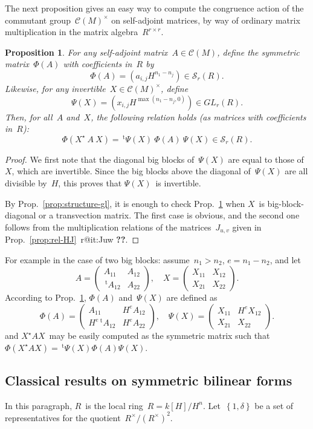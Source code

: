 \documentclass{article}%
\makeatletter
\newtheorem{prop}{Proposition}
\def\labelenumi{(\roman{enumi})}
\def\itemref#1{\expandafter\ifx\csname r@#1\endcsname\relax
  {\bfseries ??}\else{\setcounter{enumi}{\ref{#1}}\labelenumi}\fi}
\let\ro\mathscr
\def\transpose{\,{}^{\mathrm{t}\!}}
\def\acco#1{\left\{#1\right\}}
\def\mat#1{\begin{pmatrix}#1\end{pmatrix}}
\makeatother
\begin{document}
The next proposition gives an easy way to compute the congruence action
of the commutant group~$\ro C(M)^{×}$ on self-adjoint matrices, by way of
ordinary matrix multiplication in the matrix algebra~$R^{r×r}$.

\begin{prop}\label{prop:phantom}
For any self-adjoint matrix~$A ∈ \ro C(M)$, define the symmetric
matrix~$Φ(A)$ with coefficients in~$R$ by
\[ Φ(A) = (a_{i,j} H^{n_1 - n_j}) ∈ \ro S_r(R). \]
Likewise, for any invertible~$X ∈ \ro C(M)^{×}$, define
\[ Ψ(X) = (x_{i,j} H^{\max (n_1-n_j, 0)}) ∈ GL_r(R). \]
Then, for all~$A$ and~$X$, the following relation holds (as matrices with
coefficients in~$R$):
\[ Φ(X^{⋆}\:A\:X) = \transpose{Ψ(X)}\: Φ(A)\: Ψ(X) ∈ \ro S_r(R). \]
\end{prop}

\begin{proof}
We first note that the diagonal big blocks of~$Ψ(X)$ are equal to those
of~$X$, which are invertible. Since the big blocks above the diagonal
of~$Ψ(X)$ are all divisible by~$H$, this proves that $Ψ(X)$~is
invertible.

By Prop.~\ref{prop:structure-gl}, it is enough to check
Prop.~\ref{prop:phantom} when $X$~is big-block-diagonal or a transvection
matrix. The first case is obvious, and the second one
follows from the multiplication relations of the matrices~$J_{u,v}$
given in Prop.~\ref{prop:rel-HJ}~\itemref{it:Juw}.
\end{proof}

For example in the case of two big blocks: assume~$n_1 > n_2$, $e = n_1 -
n_2$, and let
\[ A = \mat{A_{11} & A_{12}\\ \transpose{A_{12}} & A_{22}}, \quad
X = \mat{X_{11} & X_{12}\\ X_{21} & X_{22}}. \]
According to Prop.~\ref{prop:phantom}, $Φ(A)$ and~$Ψ(X)$ are defined as
\[ Φ(A) = \mat{A_{11} & H^e A_{12}\\ H^e \transpose{A_{12}} & H^e A_{22}},
\quad
Ψ(X) = \mat{X_{11} & H^e X_{12}\\ X_{21} & X_{22}}. \]
and $X^{⋆} A X$~may be easily computed as the symmetric matrix such
that~$Φ(X^{⋆}AX) = \transpose{Ψ(X)} Φ(A) Ψ(X)$.

\subsection{Classical results on symmetric bilinear forms}%

In this paragraph, $R$~is the local ring~$R = k[H]/H^n$.
Let~$\acco{1, δ}$ be a set of representatives for the
quotient~$R^{×}/(R^{×})^2$.
\end{document}
